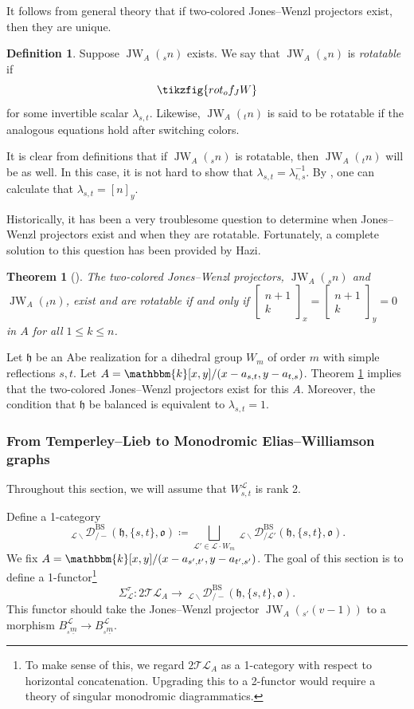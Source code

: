\documentclass{amsart}
\renewcommand{\k}{\mathbbm{k}}
\newcommand{\scrL}{\mathcal{L}}
\newcommand{\fr}[1]{\mathfrak{#1}}
\DeclareMathOperator{\BS}{BS}
\newcommand{\TLcat}{2\mathcal{T}\mathcal{L}}
\DeclareMathOperator{\JW}{JW}
\newcommand{\EWmon}[2]{\:_{#1 \backslash} \mathcal{D}_{/ #2} }
\renewcommand{\binom}[2]{\begin{bmatrix} #1 \\ #2 \end{bmatrix}}
\newtheorem{theorem}[subsubsection]{Theorem}
\theoremstyle{definition}
\newtheorem{definition}[subsubsection]{Definition}
\numberwithin{equation}{subsection}
\begin{document}
It follows from general theory that if two-colored Jones--Wenzl projectors exist, then they are unique.

\begin{definition}
    Suppose $\JW_A ({}_s n)$ exists.
    We say that $\JW_A ({}_s n)$ is \emph{rotatable} if 
    \[\tikzfig{rot_of_JW}\]
    for some invertible scalar $\lambda_{s,t}$.
    Likewise, $\JW_A ({}_t n)$ is said to be rotatable if the analogous equations hold after switching colors.
\end{definition}

It is clear from definitions that if $\JW_A ({}_s n)$ is rotatable, then $\JW_A ({}_t n)$ will be as well.
In this case, it is not hard to show that $\lambda_{s,t} = \lambda_{t,s}^{-1}$.
By \cite[Lemma 6.25]{EW17}, one can calculate that $\lambda_{s,t} = [n]_y$.

Historically, it has been a very troublesome question to determine when Jones--Wenzl projectors exist and when they are rotatable.
Fortunately, a complete solution to this question has been provided by Hazi.

\begin{theorem}[{\cite[Theorem B]{Hazi}}]\label{thm:JW_exist_and_rotatable}
    The two-colored Jones--Wenzl projectors, $\JW_A ({}_s n)$ and $\JW_A ({}_t n)$, exist and are rotatable if and only if $\binom{n+1}{k}_x = \binom{n+1}{k}_y = 0$ in $A$ for all $1 \leq k \leq n$.
\end{theorem}

Let $\fr{h}$ be an Abe realization for a dihedral group $W_m$ of order $m$ with simple reflections $s,t$.
Let $A = \k [x,y] / (x - a_{s,t}, y - a_{t,s})$. Theorem \ref{thm:JW_exist_and_rotatable} implies that the two-colored Jones--Wenzl projectors exist for this $A$.
Moreover, the condition that $\fr{h}$ be balanced is equivalent to $\lambda_{s,t} = 1$.

\subsubsection{From Temperley--Lieb to Monodromic Elias--Williamson graphs}

Throughout this section, we will assume that $W_{s,t}^{\scrL}$ is rank 2.

Define a 1-category
\[\EWmon{\scrL}{-}^{\BS} (\fr{h}, \{s,t\}, \fr{o}) \coloneq \bigsqcup_{\scrL' \in \scrL \cdot W_m } \EWmon{\scrL}{\scrL'}^{\BS} (\fr{h}, \{s,t\}, \fr{o}).\]
We fix $A = \k[x,y]/(x-a_{s',t'}, y-a_{t',s'})$.
The goal of this section is to define a 1-functor\footnote{To make sense of this, we regard $\TLcat_A$ as a 1-category with respect to horizontal concatenation. Upgrading this to a 2-functor would require a theory of singular monodromic diagrammatics.}
\[\Sigma_{\scrL}^{\tau} : \TLcat_A \to \EWmon{\scrL}{-}^{\BS} (\fr{h}, \{s,t\}, \fr{o}).\]
This functor should take the Jones--Wenzl projector $\JW_A ({}_{s'} (v-1))$ to a morphism $B_{{}_s \underline{m}}^{\scrL} \to B_{{}_s \underline{m}}^{\scrL}$.
\end{document}
